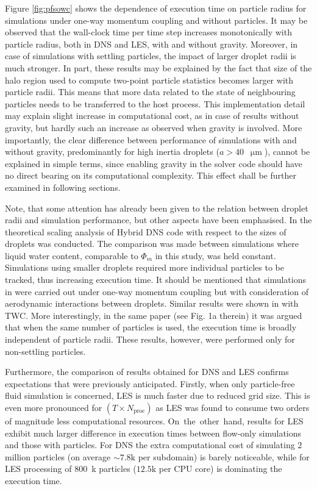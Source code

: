 \documentclass{pracamgren}
\begin{document}
Figure \ref{fig:pfsowc} shows the dependence of execution time on particle radius for simulations under one-way momentum coupling and without particles.
It may be observed that the wall-clock time per time step increases monotonically with particle radius, both in DNS and LES, with and without gravity.
Moreover, in case of simulations with settling particles, the impact of larger droplet radii is much stronger.
In part, these results may be explained by the fact that size of the halo region used to compute two-point particle statistics becomes larger with particle radii.
This means that more data related to the state of neighbouring particles needs to be transferred to the host process.
This implementation detail may explain slight increase in computational cost, as in case of results without gravity, but hardly such an increase as observed when gravity is involved.
More importantly, the clear difference between performance of simulations with and without gravity, predominantly for high inertia droplets (${a > 40}$~$\upmu\text{m}$), cannot be explained in simple terms, since enabling gravity in the solver code should have no direct bearing on its computational complexity.
This effect shall be further examined in following sections.

Note, that some attention has already been given to the relation between droplet radii and simulation performance, but other aspects have been emphasised.
In \textcite[Figure~8c therein]{Ayala2014} the theoretical scaling analysis of Hybrid DNS code with respect to the sizes of droplets was conducted.
The comparison was made between simulations where liquid water content, comparable to $\Phi_m$ in this study, was held constant.
Simulations using smaller droplets required more individual particles to be tracked, thus increasing execution time.
It should be mentioned that simulations in \parencite{Ayala2014} were carried out under one-way momentum coupling but with consideration of aerodynamic interactions between droplets. 
Similar results were shown in \textcite[Fig. 1b therein]{Rosa2022} with TWC.
More interestingly, in the same paper (see Fig. 1a therein) it was argued that when the same number of particles is used, the execution time is broadly independent of particle radii.
These results, however, were performed only for non-settling particles.

Furthermore, the comparison of results obtained for DNS and LES confirms expectations that were previously anticipated.
Firstly, when only particle-free fluid simulation is concerned, LES is much faster due to reduced grid size.
This is even more pronounced for $(T \times N_{\text{proc}})$ as LES was found to consume two orders of magnitude less computational resources.
On~the~other~hand, results for LES exhibit much larger difference in execution times between flow-only simulations and those with particles.
For DNS the extra computational cost of simulating $2$ million particles (on average $\sim 7.8\text{k}$ per subdomain) is barely noticeable, while for LES processing of $800$~k particles ($12.5\text{k}$ per CPU core) is dominating the execution time. 
\end{document}
